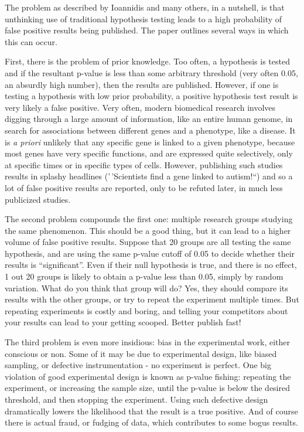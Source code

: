 \documentclass[
  letterpaper,
  DIV=11,
  numbers=noendperiod]{scrreprt}
\begin{document}
The problem as described by Ioannidis and many others, in a nutshell, is
that unthinking use of traditional hypothesis testing leads to a high
probability of false positive results being published. The paper
outlines several ways in which this can occur.

First, there is the problem of prior knowledge. Too often, a hypothesis
is tested and if the resultant p-value is less than some arbitrary
threshold (very often 0.05, an absurdly high number), then the results
are published. However, if one is testing a hypothesis with low prior
probability, a positive hypothesis test result is very likely a false
positive. Very often, modern biomedical research involves digging
through a large amount of information, like an entire human genome, in
search for associations between different genes and a phenotype, like a
disease. It is \emph{a priori} unlikely that any specific gene is linked
to a given phenotype, because most genes have very specific functions,
and are expressed quite selectively, only at specific times or in
specific types of cells. However, publishing such studies results in
splashy headlines ('\,'Scientists find a gene linked to autism!{}``) and
so a lot of false positive results are reported, only to be refuted
later, in much less publicized studies.

The second problem compounds the first one: multiple research groups
studying the same phenomenon. This should be a good thing, but it can
lead to a higher volume of false positive results. Suppose that 20
groups are all testing the same hypothesis, and are using the same
p-value cutoff of 0.05 to decide whether their results is
``significant''. Even if their null hypothesis is true, and there is no
effect, 1 out 20 groups is likely to obtain a p-value less than 0.05,
simply by random variation. What do you think that group will do? Yes,
they should compare its results with the other groups, or try to repeat
the experiment multiple times. But repeating experiments is costly and
boring, and telling your competitors about your results can lead to your
getting scooped. Better publish fast!

The third problem is even more insidious: bias in the experimental work,
either conscious or non. Some of it may be due to experimental design,
like biased sampling, or defective instrumentation - no experiment is
perfect. One big violation of good experimental design is known as
p-value fishing: repeating the experiment, or increasing the sample
size, until the p-value is below the desired threshold, and then
stopping the experiment. Using such defective design dramatically lowers
the likelihood that the result is a true positive. And of course there
is actual fraud, or fudging of data, which contributes to some bogus
results.
\end{document}
